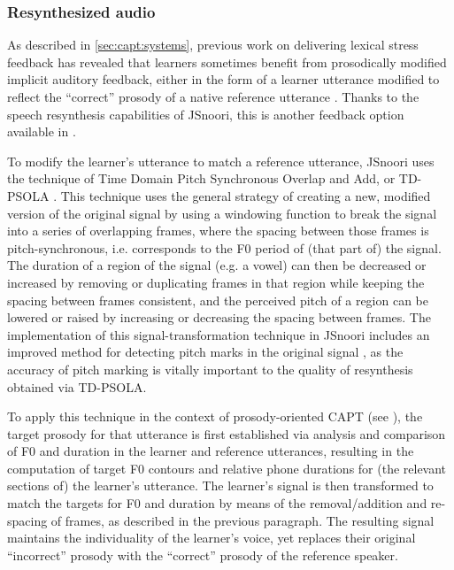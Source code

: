 			\subsubsection{Resynthesized audio}
			\label{sec:implicit:auditory:resynth}
			
			As described in \cref{sec:capt:systems}, previous work on delivering lexical stress feedback 
has revealed that learners sometimes benefit from prosodically modified implicit auditory feedback, either in the form of a learner utterance  modified to reflect the ``correct'' prosody of a native reference utterance \citep{Bonneau2011}.
			Thanks to the speech resynthesis capabilities of JSnoori, this is another feedback option available in .
			
			To modify the learner's utterance to match a reference utterance, JSnoori uses the technique of Time Domain Pitch Synchronous Overlap and Add, or TD-PSOLA \citep{Moulines1990}. This technique uses the general strategy of creating a new, modified version of the original signal by using a windowing function to break the signal into a series of overlapping frames, where the spacing between those frames is pitch-synchronous, i.e. corresponds to the F0 period of (that part of) the signal. The duration of a region of the signal  (e.g. a vowel) can then be decreased or increased by removing or duplicating frames in that region while keeping the spacing between frames consistent, and  the perceived pitch of a region can be lowered or raised by increasing or decreasing the spacing between frames. The implementation of this signal-transformation technique in JSnoori includes an improved method for detecting pitch marks in the original signal \citep{Laprie1998,Colotte2002}, as the accuracy of pitch marking is vitally important to the quality of resynthesis obtained via TD-PSOLA.
			
			To apply this technique in the context of prosody-oriented CAPT (see \cite{Henry2007,Bonneau2011}), the target prosody for that utterance is first established via analysis and comparison of F0 and duration in the learner and reference utterances, resulting in the computation of  target F0 contours and relative phone durations for (the relevant sections of) the learner's utterance. The learner's signal is then transformed to match the targets for F0 and duration by means of the removal/addition and re-spacing of frames, as described in the previous paragraph. The resulting signal maintains the individuality of the learner's voice, yet replaces their original ``incorrect'' prosody with the ``correct'' prosody of the reference speaker. 
			
